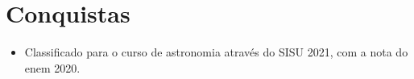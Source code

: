 \section{Conquistas}
\begin{itemize} %
    \item Classificado para o curso de astronomia através do SISU 2021, com a nota do enem 2020.
\end{itemize} %

